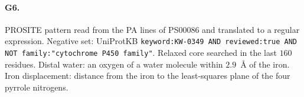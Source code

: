 \documentclass[10pt,twocolumn,a4paper]{article}
\begin{document}
\paragraph{G6.} PROSITE pattern read from the PA lines of PS00086 and
translated to a regular expression. Negative set: UniProtKB
\texttt{keyword:KW-0349 AND reviewed:true AND NOT family:"cytochrome P450
family"}. Relaxed core searched in the last $160$ residues. Distal water: an
oxygen of a water molecule within $2.9$~\AA{} of the iron. Iron displacement:
distance from the iron to the least-squares plane of the four pyrrole
nitrogens.

\sloppy


\end{document}

